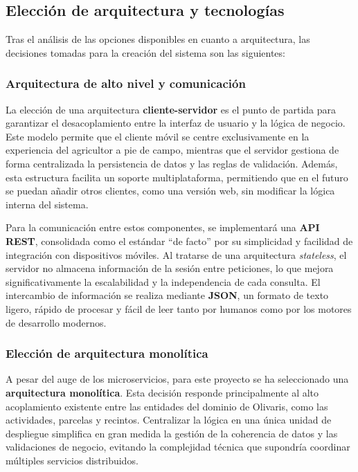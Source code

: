 \subsection{Elección de arquitectura y tecnologías}

Tras el análisis de las opciones disponibles en cuanto a arquitectura, las decisiones tomadas para la creación del sistema son las 
siguientes:

\subsubsection{Arquitectura de alto nivel y comunicación}

La elección de una arquitectura \textbf{cliente-servidor} es el punto de partida para garantizar el desacoplamiento entre la interfaz de 
usuario y la lógica de negocio. Este modelo permite que el cliente móvil se centre exclusivamente en la experiencia del agricultor a pie 
de campo, mientras que el servidor gestiona de forma centralizada la persistencia de datos y las reglas de validación. Además, esta estructura 
facilita un soporte multiplataforma, permitiendo que en el futuro se puedan añadir otros clientes, como una versión web, sin modificar la 
lógica interna del sistema.

Para la comunicación entre estos componentes, se implementará una \textbf{API REST}, consolidada como el estándar ``de facto'' por su simplicidad y 
facilidad de integración con dispositivos móviles. Al tratarse de una arquitectura \textit{stateless}, el servidor no almacena información de la sesión 
entre peticiones, lo que mejora significativamente la escalabilidad y la independencia de cada consulta. El intercambio de información se realiza mediante 
\textbf{JSON}, un formato de texto ligero, rápido de procesar y fácil de leer tanto por humanos como por los motores de desarrollo modernos.

\subsubsection{Elección de arquitectura monolítica}

A pesar del auge de los microservicios, para este proyecto se ha seleccionado una \textbf{arquitectura monolítica}. Esta decisión responde principalmente al 
alto acoplamiento existente entre las entidades del dominio de Olivaris, como las actividades, parcelas y recintos. Centralizar la lógica en una única unidad 
de despliegue simplifica en gran medida la gestión de la coherencia de datos y las validaciones de negocio, evitando la complejidad técnica que supondría 
coordinar múltiples servicios distribuidos.

